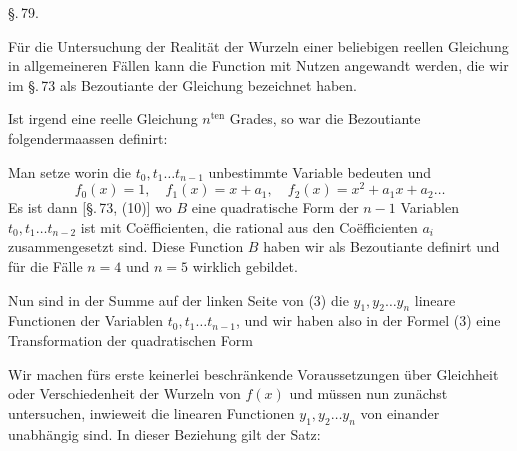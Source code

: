 
\begin{center}
\S.\,79.

\end{center}

Für die Untersuchung der Realität der Wurzeln einer beliebigen reellen Gleichung in allgemeineren Fällen kann die Function mit Nutzen angewandt werden, die wir im \S.\,73 als Bezoutiante der Gleichung bezeichnet haben.

Ist
irgend eine reelle Gleichung $n^{\mathrm{ten}}$ Grades, so war die Bezoutiante folgendermaassen definirt:

Man setze
worin die $t_0, t_1 \ldots t_{n-1}$ unbestimmte Variable bedeuten und
\[
f_0(x) = 1, \quad f_1(x) = x + a_1, \quad f_2(x) = x^2 + a_1 x + a_2 \ldots
\]
Es ist dann [\S.\,73, (10)]
wo $B$ eine quadratische Form der $n - 1$ Variablen $t_0, t_1 \ldots t_{n-2}$ ist mit Coëfficienten, die rational aus den Coëfficienten $a_i$ zusammengesetzt sind. Diese Function $B$ haben wir als Bezoutiante definirt und für die Fälle $n = 4$ und $n = 5$ wirklich gebildet.

Nun sind in der Summe auf der linken Seite von (3)
die $y_1, y_2 \ldots y_n$ lineare Functionen der Variablen $t_0, t_1 \ldots t_{n-1}$, und wir haben also in der Formel (3) eine Transformation der quadratischen Form

Wir machen fürs erste keinerlei beschränkende Voraussetzungen über Gleichheit oder Verschiedenheit der Wurzeln von $f(x)$ und müssen nun zunächst untersuchen, inwieweit die linearen Functionen $y_1, y_2 \ldots y_n$ von einander unabhängig sind. In dieser Beziehung gilt der Satz:
